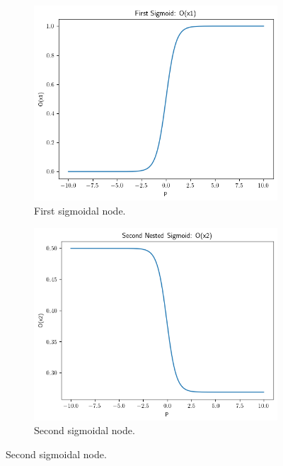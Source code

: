 \begin{figure}[h!]
  \centering
  \begin{subfigure}[b]{0.32\textwidth}
    \centering
    \includegraphics[width=\textwidth]{img/sigmoid_illus_x1_2.png}
    \caption{First sigmoidal node.}
    \label{fig:a_sigmoid_1_2}
  \end{subfigure}\hfill
  \begin{subfigure}[b]{0.32\textwidth}
    \centering
    \includegraphics[width=\textwidth]{img/sigmoid_illus_x2_2.png}
    \caption{Second sigmoidal node.}

\end{subfigure}
\end{figure}
